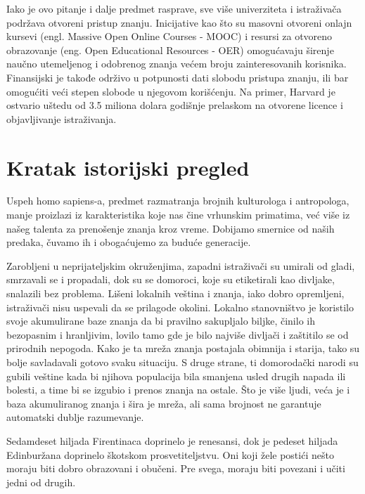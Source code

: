 \documentclass{article}
\begin{document}
Iako je ovo pitanje i dalje predmet rasprave, sve više univerziteta i istraživača podržava otvoreni pristup znanju. Inicijative kao što su masovni otvoreni onlajn kursevi (engl. Massive Open Online Courses - MOOC) i resursi za otvoreno obrazovanje (eng. Open Educational Resources - OER) omogućavaju širenje naučno utemeljenog i odobrenog znanja većem broju zainteresovanih korisnika. Finansijski je takođe održivo u potpunosti dati slobodu pristupa znanju, ili bar omogućiti veći stepen slobode u njegovom korišćenju. Na primer, Harvard je ostvario uštedu od 3.5 miliona dolara godišnje prelaskom na otvorene licence i objavljivanje istraživanja.


\section{Kratak istorijski pregled}

Uspeh homo sapiens-a, predmet razmatranja brojnih kulturologa i antropologa, manje proizlazi iz karakteristika koje nas čine vrhunskim primatima, već više iz našeg talenta za prenošenje znanja kroz vreme. Dobijamo smernice od naših predaka, čuvamo ih i obogaćujemo za buduće generacije.

Zarobljeni u neprijateljskim okruženjima, zapadni istraživači su umirali od gladi, smrzavali se i propadali, dok su se domoroci, koje su etiketirali kao divljake, snalazili bez problema. Lišeni lokalnih veština i znanja, iako dobro opremljeni, istraživači nisu uspevali da se prilagode okolini. Lokalno stanovništvo je koristilo svoje akumulirane baze znanja da bi pravilno sakupljalo biljke, činilo ih bezopasnim i hranljivim, lovilo tamo gde je bilo najviše divljači i zaštitilo se od prirodnih nepogoda. Kako je ta mreža znanja postajala obimnija i starija, tako su bolje savladavali gotovo svaku situaciju. S druge strane, ti domorodački narodi su gubili veštine kada bi njihova populacija bila smanjena usled drugih napada ili bolesti, a time bi se izgubio i prenos znanja na ostale. Što je više ljudi, veća je i baza akumuliranog znanja i šira je mreža, ali sama brojnost ne garantuje automatski dublje razumevanje.

Sedamdeset hiljada Firentinaca doprinelo je renesansi, dok je pedeset hiljada Edinburžana doprinelo škotskom prosvetiteljstvu. Oni koji žele postići nešto moraju biti dobro obrazovani i obučeni. Pre svega, moraju biti povezani i učiti jedni od drugih.
\end{document}
